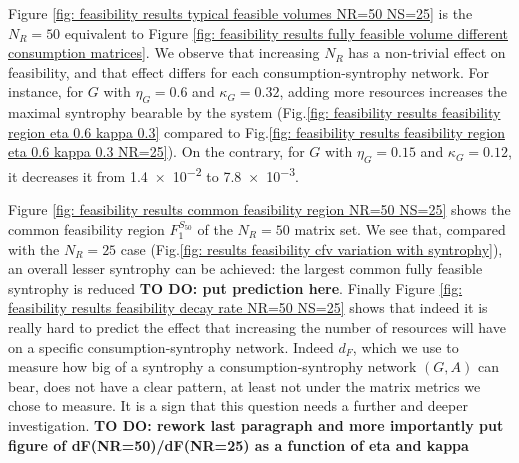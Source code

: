 \documentclass[12pt, titlepage]{report}
\begin{document}
Figure \ref{fig: feasibility results typical feasible volumes NR=50 NS=25} is the $N_R=50$ equivalent to Figure \ref{fig: feasibility results fully feasible volume different consumption matrices}. We observe that increasing $N_R$ has a non-trivial effect on feasibility, and that effect differs for each consumption-syntrophy network. For instance, for $G$ with $\eta_G=0.6$ and $\kappa_G=0.32$, adding more resources increases the maximal syntrophy bearable by the system (Fig.\ref{fig: feasibility results feasibility region eta 0.6 kappa 0.3} compared to Fig.\ref{fig: feasibility results feasibility region eta 0.6 kappa 0.3 NR=25}). On the contrary, for $G$ with $\eta_G=0.15$ and $\kappa_G=0.12$, it decreases it from \num{1.4e-2} to \num{7.8e-3}.

Figure \ref{fig: feasibility results common feasibility region NR=50 NS=25} shows the common feasibility region $F_1^{S_{50}}$ of the $N_R=50$ matrix set. We see that, compared with the $N_R=25$ case (Fig.\ref{fig: results feasibility cfv variation with syntrophy}), an overall lesser syntrophy can be achieved: the largest common fully feasible syntrophy is reduced \textbf{TO DO: put prediction here}. Finally Figure \ref{fig: feasibility results feasibility decay rate NR=50 NS=25} shows that indeed it is really hard to predict the effect that increasing the number of resources will have on a specific consumption-syntrophy network. Indeed $d_F$, which we use to measure how big of a syntrophy a consumption-syntrophy network $(G,A)$ can bear, does not have a clear pattern, at least not under the matrix metrics we chose to measure. It is a sign that this question needs a further and deeper investigation. \textbf{TO DO: rework last paragraph and more importantly put figure of dF(NR=50)/dF(NR=25) as a function of eta and kappa}
\FloatBarrier

\end{document}
